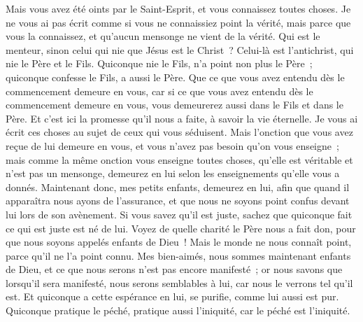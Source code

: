 \begin{multicols}{2}
Mais vous avez été oints par le Saint-Esprit, et vous connaissez toutes choses.
Je ne vous ai pas écrit comme si vous ne connaissiez point la vérité, mais parce que vous la connaissez, et qu'aucun mensonge ne vient de la vérité.
Qui est le menteur, sinon celui qui nie que Jésus est le Christ~? Celui-là est l'antichrist, qui nie le Père et le Fils.
Quiconque nie le Fils, n'a point non plus le Père~; quiconque confesse le Fils, a aussi le Père.
Que ce que vous avez entendu dès le commencement demeure en vous, car si ce que vous avez entendu dès le commencement demeure en vous, vous demeurerez aussi dans le Fils et dans le Père.
Et c'est ici la promesse qu'il nous a faite, à savoir la vie éternelle.
Je vous ai écrit ces choses au sujet de ceux qui vous séduisent.
Mais l'onction que vous avez reçue de lui demeure en vous, et vous n'avez pas besoin qu'on vous enseigne~; mais comme la même onction vous enseigne toutes choses, qu'elle est véritable et n'est pas un mensonge, demeurez en lui selon les enseignements qu'elle vous a donnés.
Maintenant donc, mes petits enfants, demeurez en lui, afin que quand il apparaîtra nous ayons de l'assurance, et que nous ne soyons point confus devant lui lors de son avènement.
Si vous savez qu'il est juste, sachez que quiconque fait ce qui est juste est né de lui.
\VerseOne{}Voyez de quelle charité le Père nous a fait don, pour que nous soyons appelés enfants de Dieu~! Mais le monde ne nous connaît point, parce qu'il ne l'a point connu.
Mes bien-aimés, nous sommes maintenant enfants de Dieu, et ce que nous serons n'est pas encore manifesté~; or nous savons que lorsqu'il sera manifesté, nous serons semblables à lui, car nous le verrons tel qu'il est.
Et quiconque a cette espérance en lui, se purifie, comme lui aussi est pur.
Quiconque pratique le péché, pratique aussi l'iniquité, car le péché est l'iniquité.

\end{multicols}
